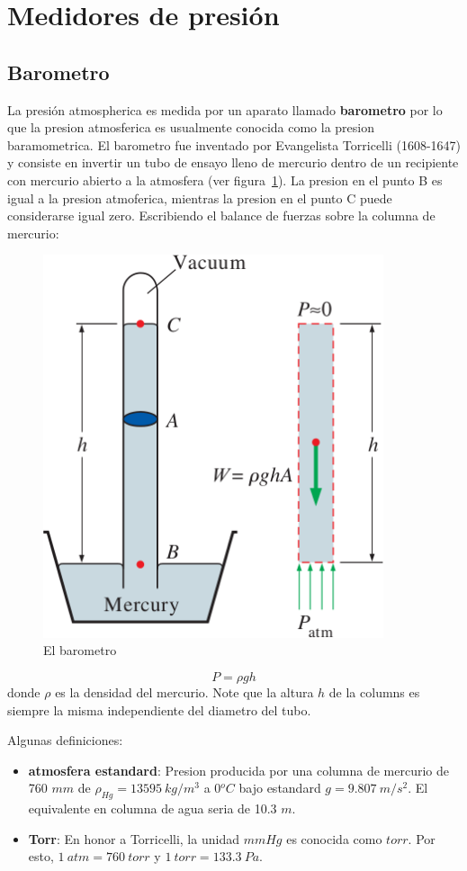 \documentclass[10pt, oneside]{article}
\begin{document}
\section{Medidores de presi\'on}
\subsection{Barometro}
La presi\'on atmospherica es medida por un aparato llamado \textbf{barometro} por lo que la presion atmosferica es usualmente conocida como la presion baramometrica. El barometro fue inventado por Evangelista Torricelli (1608-1647) y consiste en invertir un tubo de ensayo lleno de mercurio dentro de un recipiente con mercurio abierto a la atmosfera (ver figura~\ref{baro1}). La presion en el punto B es igual a la presion atmoferica, mientras la presion en el punto C puede considerarse igual zero. Escribiendo el balance de fuerzas sobre la columna de mercurio:

\begin{figure}[h]
\centering
\includegraphics[width=10cm]{baro1}
\caption{El barometro}
\label{baro1}
\end{figure}


\begin{equation}
P = \rho g h
\label{bb1}
\end{equation}
donde $\rho$ es la densidad del mercurio. Note que la altura $h$ de la columns es siempre la misma independiente del diametro del tubo. 

Algunas definiciones:
\begin{itemize}
\item \textbf{atmosfera estandard}: Presion producida por una columna de mercurio de 760 $mm$ de $\rho_{Hg} = 13595\ kg/m^3$ a 0$^oC$ bajo estandard $g=9.807\ m/s^2$. El equivalente en columna de agua seria de 10.3 $m$.
\item \textbf{Torr}: En honor a Torricelli, la unidad $mmHg$ es conocida como $torr$. Por esto, $1\ atm = 760\ torr$ y $1\ torr = 133.3\ Pa$. 
\end{itemize}
\end{document}

